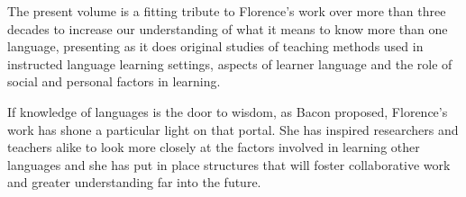 \documentclass[output=paper]{langscibook}
\begin{document}
The present volume is a fitting tribute to Florence’s work over more than three decades to increase our understanding of what it means to know more than one language, presenting as it does original studies of teaching methods used in instructed language learning settings, aspects of learner language and the role of social and personal factors in learning.

If knowledge of languages is the door to wisdom, as Bacon proposed, Florence’s work has shone a particular light on that portal. She has inspired researchers and teachers alike to look more closely at the factors involved in learning other languages and she has put in place structures that will foster collaborative work and greater understanding far into the future.
\end{document}
